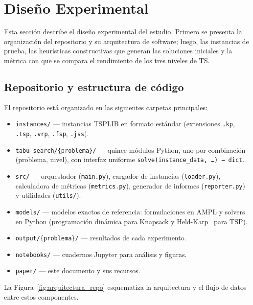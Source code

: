 \section{Diseño Experimental}
\label{sec:metodologia}

Esta sección describe el diseño experimental del estudio. Primero se
presenta la organización del repositorio y su arquitectura de software;
luego, las instancias de prueba, las heurísticas constructivas que generan
las soluciones iniciales y la métrica con que se compara el rendimiento
de los tres niveles de TS.

\subsection{Repositorio y estructura de código}

El repositorio está organizado en las siguientes carpetas principales:

\begin{itemize}
  \item \texttt{instances/} — instancias TSPLIB en formato estándar
    (extensiones \texttt{.kp}, \texttt{.tsp}, \texttt{.vrp}, \texttt{.fsp},
    \texttt{.jss}).
  \item \texttt{tabu\_search/\{problema\}/} — quince módulos Python,
    uno por combinación (problema, nivel), con interfaz uniforme
    \texttt{solve(instance\_data, \ldots) → dict}.
  \item \texttt{src/} — orquestador (\texttt{main.py}), cargador de
    instancias (\texttt{loader.py}), calculadora de métricas
    (\texttt{metrics.py}), generador de informes (\texttt{reporter.py})
    y utilidades (\texttt{utils/}).
  \item \texttt{models/} — modelos exactos de referencia: formulaciones en
    AMPL y solvers en Python (programación dinámica para Knapsack y
    Held-Karp~\cite{held1962dynamic} para TSP).
  \item \texttt{output/\{problema\}/} — resultados de cada experimento.
  \item \texttt{notebooks/} — cuadernos Jupyter para análisis y figuras.
  \item \texttt{paper/} — este documento y sus recursos.
\end{itemize}

La Figura~\ref{fig:arquitectura_repo} esquematiza la arquitectura y el
flujo de datos entre estos componentes.

